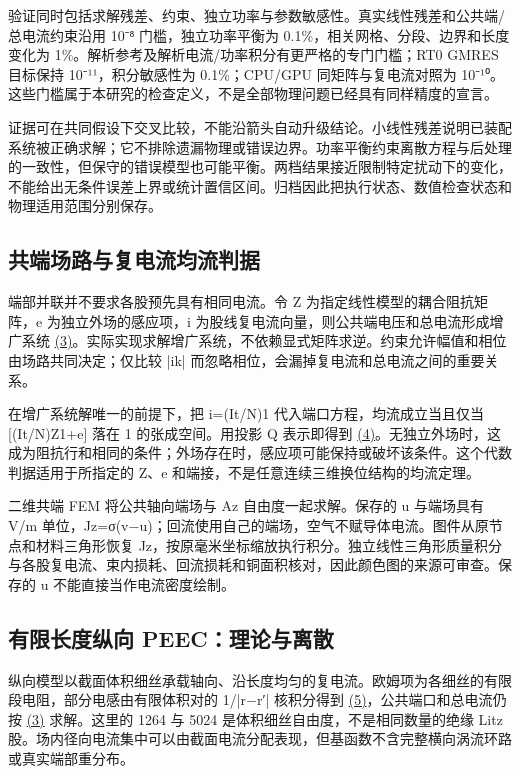 \documentclass[journal,10pt]{IEEEtran}
\begin{document}
验证同时包括求解残差、约束、独立功率与参数敏感性。真实线性残差和公共端/总电流约束沿用 10⁻⁸ 门槛，独立功率平衡为 0.1\%，相关网格、分段、边界和长度变化为 1\%。解析参考及解析电流/功率积分有更严格的专门门槛；RT0 GMRES 目标保持 10⁻¹¹，积分敏感性为 0.1\%；CPU/GPU 同矩阵与复电流对照为 10⁻¹⁰。这些门槛属于本研究的检查定义，不是全部物理问题已经具有同样精度的宣言。


证据可在共同假设下交叉比较，不能沿箭头自动升级结论。小线性残差说明已装配系统被正确求解；它不排除遗漏物理或错误边界。功率平衡约束离散方程与后处理的一致性，但保守的错误模型也可能平衡。两档结果接近限制特定扰动下的变化，不能给出无条件误差上界或统计置信区间。归档因此把执行状态、数值检查状态和物理适用范围分别保存。


\subsection*{共端场路与复电流均流判据}
\hypertarget{02.common.heading}{}
端部并联并不要求各股预先具有相同电流。令 Z 为指定线性模型的耦合阻抗矩阵，e 为独立外场的感应项，i 为股线复电流向量，则公共端电压和总电流形成增广系统 \href{paper_zh-CN_ieee.pdf#E04}{(3)}。实际实现求解增广系统，不依赖显式矩阵求逆。约束允许幅值和相位由场路共同决定；仅比较 |ik| 而忽略相位，会漏掉复电流和总电流之间的重要关系。


在增广系统解唯一的前提下，把 i=(It/N)1 代入端口方程，均流成立当且仅当 [(It/N)Z1+e] 落在 1 的张成空间。用投影 Q 表示即得到 \href{paper_zh-CN_ieee.pdf#E05}{(4)}。无独立外场时，这成为阻抗行和相同的条件；外场存在时，感应项可能保持或破坏该条件。这个代数判据适用于所指定的 Z、e 和端接，不是任意连续三维换位结构的均流定理。


二维共端 FEM 将公共轴向端场与 Az 自由度一起求解。保存的 u 与端场具有 V/m 单位，Jz=σ(v−u)；回流使用自己的端场，空气不赋导体电流。图件从原节点和材料三角形恢复 Jz，按原毫米坐标缩放执行积分。独立线性三角形质量积分与各股复电流、束内损耗、回流损耗和铜面积核对，因此颜色图的来源可审查。保存的 u 不能直接当作电流密度绘制。


\subsection*{有限长度纵向 PEEC：理论与离散}
\hypertarget{02.peec_method.heading}{}
纵向模型以截面体积细丝承载轴向、沿长度均匀的复电流。欧姆项为各细丝的有限段电阻，部分电感由有限体积对的 1/|r−r′| 核积分得到 \href{paper_zh-CN_ieee.pdf#E08}{(5)}，公共端口和总电流仍按 \href{paper_zh-CN_ieee.pdf#E04}{(3)} 求解。这里的 1264 与 5024 是体积细丝自由度，不是相同数量的绝缘 Litz 股。场内径向电流集中可以由截面电流分配表现，但基函数不含完整横向涡流环路或真实端部重分布。
\end{document}
